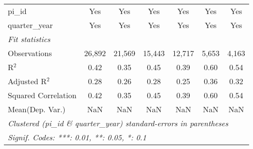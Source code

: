 \begin{tabular}{lcccccc}
   pi\_id                                                     & Yes           & Yes           & Yes          & Yes            & Yes            & Yes\\  
   quarter\_year                                              & Yes           & Yes           & Yes          & Yes            & Yes            & Yes\\  
   \midrule
   \emph{Fit statistics}\\
   Observations                                               & 26,892        & 21,569        & 15,443       & 12,717         & 5,653          & 4,163\\  
   R$^2$                                                      & 0.42          & 0.35          & 0.45         & 0.39           & 0.60           & 0.54\\  
   Adjusted R$^2$                                             & 0.28          & 0.26          & 0.28         & 0.25           & 0.36           & 0.32\\  
   Squared Correlation                                        & 0.42          & 0.35          & 0.45         & 0.39           & 0.60           & 0.54\\  
Mean(Dep. Var.) & NaN & NaN & NaN & NaN & NaN & NaN \\
   \midrule \midrule
   \multicolumn{7}{l}{\emph{Clustered (pi\_id \& quarter\_year) standard-errors in parentheses}}\\
   \multicolumn{7}{l}{\emph{Signif. Codes: ***: 0.01, **: 0.05, *: 0.1}}\\
\end{tabular}
\par\endgroup
